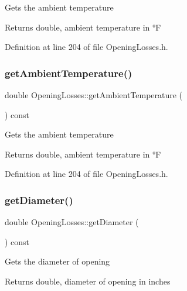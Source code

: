 Gets the ambient temperature \begin{DoxyReturn}{Returns}
double, ambient temperature in °F 
\end{DoxyReturn}


Definition at line 204 of file Opening\+Losses.\+h.

\mbox{\label{class_opening_losses_a198f46508744d6943846ea95a9513a45}} 
\subsubsection{\texorpdfstring{get\+Ambient\+Temperature()}{getAmbientTemperature()}\hspace{0.1cm}{\footnotesize\ttfamily [3/3]}}
{\footnotesize\ttfamily double Opening\+Losses\+::get\+Ambient\+Temperature (\begin{DoxyParamCaption}{ }\end{DoxyParamCaption}) const\hspace{0.3cm}{\ttfamily [inline]}}

Gets the ambient temperature \begin{DoxyReturn}{Returns}
double, ambient temperature in °F 
\end{DoxyReturn}


Definition at line 204 of file Opening\+Losses.\+h.

\mbox{\label{class_opening_losses_a8ed643300b0f5b606be6cd669cd413c3}} 
\subsubsection{\texorpdfstring{get\+Diameter()}{getDiameter()}\hspace{0.1cm}{\footnotesize\ttfamily [1/3]}}
{\footnotesize\ttfamily double Opening\+Losses\+::get\+Diameter (\begin{DoxyParamCaption}{ }\end{DoxyParamCaption}) const\hspace{0.3cm}{\ttfamily [inline]}}

Gets the diameter of opening \begin{DoxyReturn}{Returns}
double, diameter of opening in inches 
\end{DoxyReturn}


